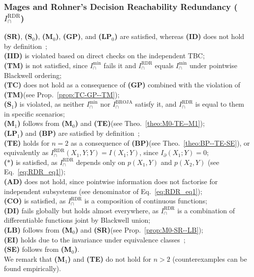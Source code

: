 \documentclass{article}
\newcommand{\ts}[1]{\ensuremath{_{\text{#1}}}}
\newcommand{\SR}{\textbf{(SR)}\xspace} %
\newcommand{\Sz}{\textbf{(S\ts{0})}\xspace} %
\newcommand{\Mz}{\textbf{(M\ts{0})}\xspace} %
\newcommand{\GP}{\textbf{(GP)}\xspace} %
\newcommand{\LPz}{\textbf{(LP\ts{0})}\xspace} %
\newcommand{\ID}{\textbf{(ID)}\xspace} %
\newcommand{\IID}{\textbf{(IID)}\xspace} %
\newcommand{\TM}{\textbf{(TM)}\xspace} %
\newcommand{\TC}{\textbf{(TC)}\xspace} %
\newcommand{\So}{\textbf{(S\ts{1})}\xspace} %
\newcommand{\Mo}{\textbf{(M\ts{1})}\xspace} %
\newcommand{\LPo}{\textbf{(LP\ts{1})}\xspace} %
\newcommand{\BP}{\textbf{(BP)}\xspace} %
\newcommand{\TE}{\textbf{(TE)}\xspace} %
\newcommand{\AST}{\textbf{($\boldsymbol{\ast}$)}\xspace} %
\newcommand{\AD}{\textbf{(AD)}\xspace} %
\newcommand{\CO}{\textbf{(CO)}\xspace} %
\newcommand{\LB}{\textbf{(LB)}\xspace} %
\newcommand{\EI}{\textbf{(EI)}\xspace} %
\newcommand{\SE}{\textbf{(SE)}\xspace} %
\newcommand{\DI}{\textbf{(DI)}\xspace}
\newcommand{\Imin}{\ensuremath{I_\cap^{\text{min}}}\xspace}
\newcommand{\IBROJA}{\ensuremath{I_\cap^{\text{BROJA}}}\xspace}
\newcommand{\IRDR}{\ensuremath{I_\cap^{\text{RDR}}}\xspace}
\begin{document}
\subsubsection*{Mages and Rohner's Decision Reachability Redundancy ($\IRDR$)}
    \SR, \Sz, \Mz, \GP, and \LPz are satisfied, whereas \ID does not hold by definition~\cite{mages2023decomposing}; \\
    \IID is violated based on direct checks on the independent TBC; \\
    \TM is not satisfied, since $\Imin$ fails it and \IRDR equals $\Imin$ under pointwise Blackwell ordering; \\
    \TC does not hold as a consequence of \GP combined with the violation of \TM (see Prop.~\ref{prop:TC-GP--TM}); \\
    \So is violated, as neither $\Imin$ nor $\IBROJA$ satisfy it, and \IRDR is equal to them in specific scenarios; \\
    \Mo follows from \Mz and \TE (see Theo.~\ref{theo:M0-TE--M1}); \\
    \LPo and \BP are satisfied by definition~\cite{mages2023decomposing}; \\
    \TE holds for $n=2$ as a consequence of \BP (see Theo.~\ref{theo:BP--TE-SE}), or equivalently as $\IRDR(X_1,Y;Y)=I(X_1;Y)$, since $I_\partial(X_1;Y)=0$; \\
    \AST is satisfied, as $\IRDR$ depends only on $p(X_1,Y)$ and $p(X_2,Y)$ (see Eq.~\eqref{eq:RDR_eq1}); \\
    \AD does not hold, since pointwise information does not factorise for independent subsystems (see denominator of Eq.~\eqref{eq:RDR_eq1}); \\
    \CO is satisfied, as $\IRDR$ is a composition of continuous functions; \\
    \DI fails globally but holds almost everywhere, as \IRDR is a combination of differentiable functions joint by Blackwell union; \\  
    \LB follows from \Mz and \SR (see Prop.~\ref{prop:M0-SR--LB}); \\
    \EI holds due to the invariance under equivalence classes~\cite{li2011connection}; \\
    \SE follows from \Mz. \\
    We remark that \Mo and \TE do not hold for $n>2$ (counterexamples can be found empirically). 
\end{document}
